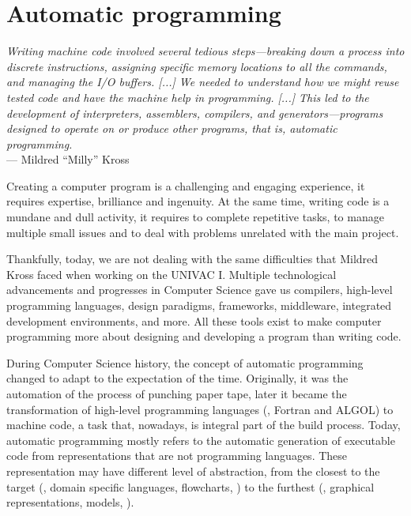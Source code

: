 \chapter{Automatic programming}\label{ch:code-gen}

\begin{flushright}{\slshape Writing machine code involved several tedious steps—breaking down a process into discrete instructions, assigning specific memory locations to all the commands, and managing the I/O buffers. [...] We needed to understand how we might reuse tested code and have the machine help in programming. [...] This led to the development of interpreters, assemblers, compilers, and generators—programs designed to operate on or produce other programs, that is, automatic programming.} \\ \medskip
    --- Mildred ``Milly'' Kross
\end{flushright}

Creating a computer program is a challenging and engaging experience, it requires expertise, brilliance and ingenuity. At the same time, writing code is a mundane and dull activity, it requires to complete repetitive tasks, to manage multiple small issues and to deal with problems unrelated with the main project.

Thankfully, today, we are not dealing with the same difficulties that Mildred Kross faced when working on the UNIVAC I. Multiple technological advancements and progresses in Computer Science gave us compilers, high-level programming languages, design paradigms, frameworks, middleware, integrated development environments, and more. All these tools exist to make computer programming more about designing and developing a program than writing code. 

During Computer Science history, the concept of automatic programming changed to adapt to the expectation of the time. Originally, it was the automation of the process of punching paper tape, later it became the transformation of high-level programming languages (\eg, Fortran and ALGOL) to machine code, a task that, nowadays, is integral part of the build process. Today, automatic programming mostly refers to the automatic generation of executable code from representations that are not programming languages. These representation may have different level of abstraction, from the closest to the target (\eg, domain specific languages, flowcharts, \etc) to the furthest (\eg, graphical representations, models, \etc).

